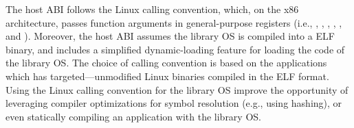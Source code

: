 The host ABI follows the Linux calling convention,
which, on the x86 architecture, passes function arguments in general-purpose registers (i.e., , , , , , and ).
Moreover, the host ABI assumes the library OS is compiled into a ELF binary, and includes a simplified dynamic-loading feature for loading the code of the library OS.
The choice of calling convention is based on
the applications which \graphene{} has targeted---unmodified Linux binaries compiled in the ELF format.
Using the Linux calling convention for the library OS
improve the opportunity of leveraging compiler optimizations for symbol resolution (e.g., using hashing), or even statically compiling an application with the library OS. 












